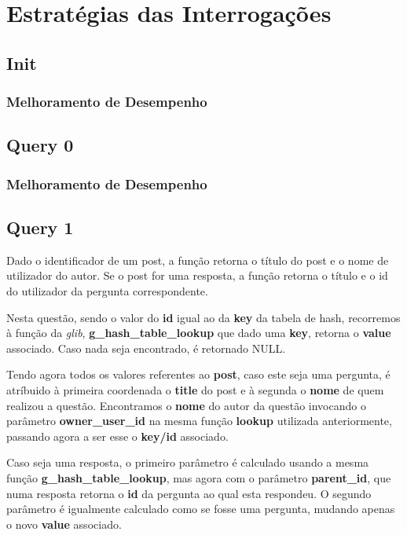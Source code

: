 \documentclass[a4paper]{article}
\begin{document}
\section{Estratégias das Interrogações}
\label{sec:estrategias}

\subsection{Init}

\subsubsection{Melhoramento de Desempenho}

\subsection{Query 0}

\subsubsection{Melhoramento de Desempenho}

\subsection{Query 1}

Dado o identificador de um post, a função retorna o título do post 
e o nome de utilizador do autor. Se o post for uma resposta, a função
retorna o título e o id do utilizador da pergunta correspondente.

Nesta questão, sendo o valor do \textbf{id} igual ao da \textbf{key} 
da tabela de hash, recorremos à função da \textit{glib},
\textbf{g\_hash\_table\_lookup} que dado uma \textbf{key},
retorna o \textbf{value} associado. Caso nada seja encontrado,
é retornado NULL.

Tendo agora todos os valores referentes ao \textbf{post}, caso este
seja uma pergunta, é atríbuido à primeira coordenada o \textbf{title}
do post e à segunda o \textbf{nome} de quem realizou a questão.
Encontramos o \textbf{nome} do autor da questão invocando o parâmetro
\textbf{owner\_user\_id} na mesma função \textbf{lookup} utilizada 
anteriormente, passando agora a ser esse o \textbf{key/id} associado.

Caso seja uma resposta, o primeiro parâmetro é calculado usando a mesma 
função \textbf{g\_hash\_table\_lookup}, mas agora com o 
parâmetro \textbf{parent\_id}, que numa resposta retorna o \textbf{id} 
da pergunta ao qual esta respondeu. O segundo parâmetro é igualmente
calculado como se fosse uma pergunta, mudando apenas o novo 
\textbf{value} associado.
\end{document}
